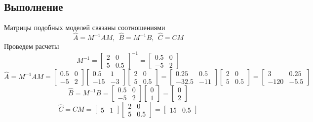 \documentclass[a4paper, 12pt]{article}
\begin{document}
    \subsection{Выполнение}
    Матрицы подобных моделей связаны соотношениями
    $$\hat{A}=M^{-1}AM,\ \ \hat{B}=M^{-1}B,\ \ \hat{C}=CM$$
    Проведем расчеты
    $$M^{-1}=
    \begin{bmatrix}
        2 & 0\\
        5 & 0.5
    \end{bmatrix}^{-1}=
    \begin{bmatrix}
        0.5 & 0\\
        -5 & 2
    \end{bmatrix}$$
    $$\hat{A}=M^{-1}AM=
    \begin{bmatrix}
        0.5 & 0\\
        -5 & 2
    \end{bmatrix}
    \begin{bmatrix}
        0.5 & 1\\
        -15 & -3
    \end{bmatrix}
    \begin{bmatrix}
        2 & 0\\
        5 & 0.5
    \end{bmatrix}=
    \begin{bmatrix}
        0.25 & 0.5\\
        -32.5 & -11
    \end{bmatrix}
    \begin{bmatrix}
        2 & 0\\
        5 & 0.5
    \end{bmatrix}=
    \begin{bmatrix}
        3 & 0.25\\
        -120 & -5.5
    \end{bmatrix}
    $$
    $$\hat{B}=M^{-1}B=
    \begin{bmatrix}
        0.5 & 0\\
        -5 & 2
    \end{bmatrix}
    \begin{bmatrix}
        0\\
        1
    \end{bmatrix}=
    \begin{bmatrix}
        0\\
        2
    \end{bmatrix}
    $$
    $$\hat{C}=CM=
    \begin{bmatrix}
        5 & 1
    \end{bmatrix}
    \begin{bmatrix}
        2 & 0\\
        5 & 0.5
    \end{bmatrix}=
    \begin{bmatrix}
        15 & 0.5
    \end{bmatrix}
    $$
\end{document}
